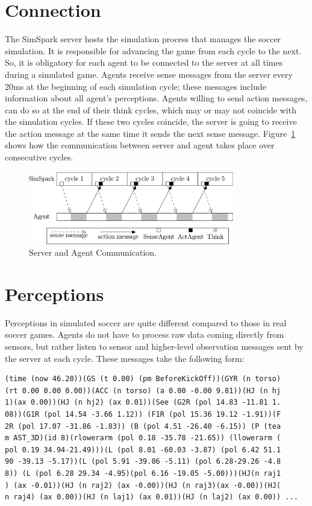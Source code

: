 \section{Connection}
The SimSpark server hosts the simulation process that manages the soccer simulation. It is responsible for advancing the game from each cycle to the next. So, it is obligatory for each agent to be connected to the server at all times during a simulated game. Agents receive sense messages from the server every 20ms at the beginning of each simulation cycle; these messages include information about all agent's perceptions. Agents willing to send action messages, can do so at the end of their think cycles, which may or may not coincide with the simulation cycles. If these two cycles coincide, the server is going to receive the action message at the same time it sends the next sense message. Figure~\ref{fig:Simulation-Update-Loop} shows how the communication between server and agent takes place over consecutive cycles.

\begin{figure}[t!]
\centering
  \includegraphics[width=0.8\textwidth]{Chapter3/figures/SimulationUpdateLoopSynchronizationBetweenSimSparkAndAgent.png}
  \caption{Server and Agent Communication.}
  \label{fig:Simulation-Update-Loop}
\end{figure}


\section{Perceptions}
Perceptions in simulated soccer are quite different compared to those in  real soccer games. Agents do not have to process raw data coming directly from sensors, but rather listen to sensor and higher-level observation messages sent by the server at each cycle. These messages take the following form:

\begin{verbatim}
(time (now 46.20))(GS (t 0.00) (pm BeforeKickOff))(GYR (n torso)
(rt 0.00 0.00 0.00))(ACC (n torso) (a 0.00 -0.00 9.81))(HJ (n hj
1)(ax 0.00))(HJ (n hj2) (ax 0.01))(See (G2R (pol 14.83 -11.81 1.
08))(G1R (pol 14.54 -3.66 1.12)) (F1R (pol 15.36 19.12 -1.91))(F
2R (pol 17.07 -31.86 -1.83)) (B (pol 4.51 -26.40 -6.15)) (P (tea
m AST_3D)(id 8)(rlowerarm (pol 0.18 -35.78 -21.65)) (llowerarm (
pol 0.19 34.94-21.49)))(L (pol 8.01 -60.03 -3.87) (pol 6.42 51.1
90 -39.13 -5.17))(L (pol 5.91 -39.06 -5.11) (pol 6.28-29.26 -4.8
8)) (L (pol 6.28 29.34 -4.95)(pol 6.16 -19.05 -5.00)))(HJ(n raj1
) (ax -0.01))(HJ (n raj2) (ax -0.00))(HJ (n raj3)(ax -0.00))(HJ(
n raj4) (ax 0.00))(HJ (n laj1) (ax 0.01))(HJ (n laj2) (ax 0.00)) ...\end{verbatim}

